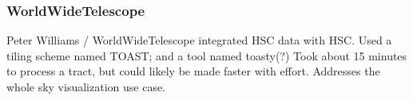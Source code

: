\subsubsection{WorldWideTelescope}
Peter Williams / WorldWideTelescope integrated HSC data with HSC.
Used a tiling scheme named TOAST; and a tool named toasty(?)
Took about 15 minutes to process a tract, but could likely be made faster with effort.
Addresses the whole sky visualization use case.


